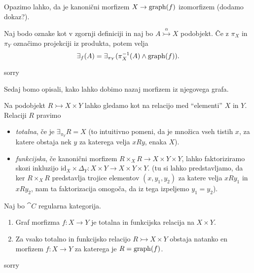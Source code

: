 \documentclass[../kategoricna_logika.tex]{subfiles}
\begin{document}
Opazimo lahko, da je kanonični morfizem $X \to \operatorname{graph}(f)$ izomorfizem (dodamo dokaz?).
\begin{lema}
  Naj bodo oznake kot v zgornji definiciji in naj bo $A \overset{\alpha}{\rightarrowtail} X$ podobjekt. Če z $\pi_X$ in $\pi_Y$ označimo projekciji iz produkta, potem velja
  $$\exists_f(A) = \exists_{\pi_Y}(\pi_X^{-1}(A) \wedge \operatorname{graph}(f)).$$
\end{lema}
\begin{dokaz}
  sorry
\end{dokaz}

\noindent
Sedaj bomo opisali, kako lahko dobimo nazaj morfizem iz njegovega grafa.
\begin{definicija}
  Na podobjekt $R \rightarrowtail X \times Y$ lahko gledamo kot na relacijo med ``elementi'' $X$ in $Y$. Relaciji $R$ pravimo 
  \begin{itemize}
    \item \emph{totalna}, če je $\exists_{\pi_Y}R = X$ (to intuitivno pomeni, da je množica vseh tistih $x$, za katere obstaja nek $y$ za katerega velja $xRy$, enaka $X$).
    \item \emph{funkcijska}, če kanonični morfizem $R \times_X R \to X \times Y \times Y$, lahko faktoriziramo skozi inkluzijo $\mathrm{id}_X \times \Delta_Y : X \times Y \to X \times Y \times Y$. (tu si lahko predstavljamo, da ker $R \times_X R$ predstavlja trojice elementov $(x, y_1, y_2)$ za katere velja $xRy_1$ in $xRy_2$, nam ta faktorizacija omogoča, da iz tega izpeljemo $y_1 = y_2$).
  \end{itemize}
\end{definicija}
\begin{lema}
  Naj bo $\cat{C}$ regularna kategorija.
  \begin{enumerate}[label=(\roman*)]
    \item Graf morfizma $f : X \to Y$ je totalna in funkcijska relacija na $X \times Y$.
    \item Za vsako totalno in funkcijsko relacijo $R \rightarrowtail X \times Y$ obstaja natanko en morfizem $f : X \to Y$ za katerega je $R = \operatorname{graph}(f)$.
  \end{enumerate}
\end{lema}
\begin{dokaz}
  sorry
\end{dokaz}
\end{document}
